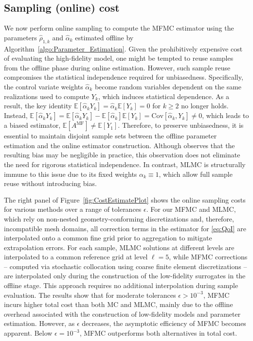 \subsection{Sampling (online) cost} \label{sec:Online_Sampling}
We now perform online sampling  to compute the MFMC estimator using the parameters $\widehat\rho_{1,k}$ and $\widehat \alpha_k$ estimated offline by Algorithm~\ref{algo:Parameter_Estimation}.  Given the prohibitively expensive cost of evaluating the high-fidelity model, one might be tempted to reuse samples from the offline phase during online estimation. However, such sample reuse compromises the statistical independence required for unbiasedness. Specifically, the control variate weights $\widehat\alpha_k$ become random variables dependent on the same realizations used to compute $Y_k$, which induces statistical dependence. As a result, the key identity $\mathbb{E}[\widehat\alpha_k Y_k] = \widehat\alpha_k \mathbb{E}[Y_k]=0$ for $k\ge 2$ no longer holds. Instead, $\mathbb{E}[\widehat\alpha_k Y_k] = \mathbb{E}[\widehat\alpha_k Y_k]-\mathbb{E}[\widehat\alpha_k]\mathbb{E}[Y_k] = \text{Cov}[\widehat\alpha_k,Y_k]\neq 0$, which leads to a biased estimator, $\mathbb{E}[A^{\text{MF}}] \neq \mathbb{E}[Y_1]$. Therefore, to preserve unbiasedness, it is essential to maintain disjoint sample sets between the offline parameter estimation and the online estimator construction. Although \cite{KoFaPeDiJeNeBu:2022} observes that the resulting bias may be negligible in practice, this observation does not eliminate the need for rigorous statistical independence. In contrast, MLMC is structurally immune to this issue due to its fixed weights $\alpha_k \equiv 1$, which allow full sample reuse without introducing bias.


The right panel of Figure~\ref{fig:CostEstimatePlot} shows the online sampling costs for various methods over a range of tolerances $\epsilon$. For our MFMC and MLMC, which rely on non-nested geometry-conforming discretizations and, therefore, incompatible mesh domains, all correction terms in the estimator for \eqref{eq:QoI} are interpolated onto a common fine grid prior to aggregation to mitigate extrapolation errors. For each sample, MLMC solutions at different levels are interpolated to a common reference grid at level $\ell=5$, while MFMC corrections -- computed via stochastic collocation using coarse finite element discretizations -- are interpolated only during the construction of the low-fidelity surrogates in the offline stage. This approach requires no additional interpolation during sample evaluation. The results show that for moderate tolerances $\epsilon > 10^{-3}$, MFMC incurs higher total cost than both MC and MLMC, mainly due to the offline overhead associated with the construction of low-fidelity models and parameter estimation. However, as $\epsilon$ decreases, the asymptotic efficiency of MFMC becomes apparent. Below $\epsilon = 10^{-3}$, MFMC outperforms both alternatives in total cost.

